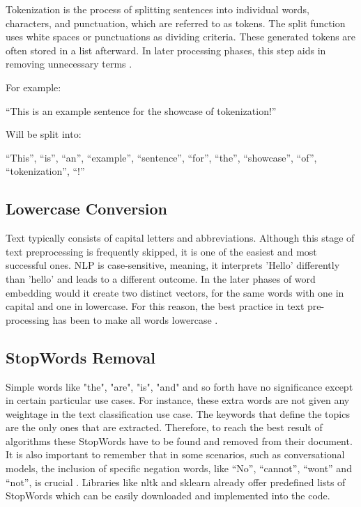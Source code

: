 Tokenization is the process of splitting sentences into individual words, characters, and punctuation, which are referred to as tokens. The split function uses white spaces or punctuations as dividing criteria. These generated tokens are often stored in a list afterward. In later processing phases, this step aids in removing unnecessary terms \citep{tabassum_survey_2020}. 

For example:

“This is an example sentence for the showcase of tokenization!”

Will be split into:

“This”, “is”, “an”, “example”, “sentence”, “for”, “the”, “showcase”, “of”, “tokenization”, “!”

\subsection{Lowercase Conversion}

Text typically consists of capital letters and abbreviations. Although this stage of text preprocessing is frequently skipped, it is one of the easiest and most successful ones. NLP is case-sensitive, meaning, it interprets 'Hello' differently than 'hello' and leads to a different outcome. In the later phases of word embedding would it create two distinct vectors, for the same words with one in capital and one in lowercase. For this reason, the best practice in text pre-processing has been to make all words lowercase \citep{tabassum_survey_2020}.

\subsection{StopWords Removal}

Simple words like "the", "are", "is", "and" and so forth have no significance except in certain particular use cases. For instance, these extra words are not given any weightage in the text classification use case. The keywords that define the topics are the only ones that are extracted. Therefore, to reach the best result of algorithms these StopWords have to be found and removed from their document. It is also important to remember that in some scenarios, such as conversational models, the inclusion of specific negation words, like “No”, “cannot”, “wont” and “not”, is crucial \citep{tabassum_survey_2020}. Libraries like nltk and sklearn already offer predefined lists of StopWords which can be easily downloaded and implemented into the code.

